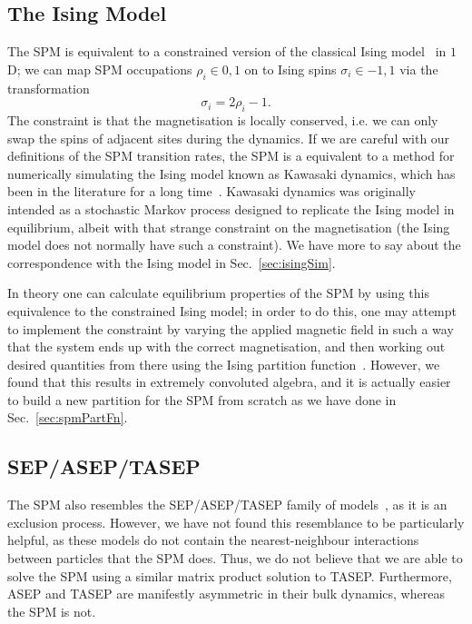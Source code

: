 \subsection{The Ising Model}
The SPM is equivalent to a constrained version of the classical Ising 
model~\cite{lenz1920, Ising1925, strecka2015} in $1$D; we can map SPM
occupations $\rho_i \in {0, 1}$ on to Ising spins $\sigma_i \in {-1, 1}$ via the transformation
\begin{equation}
 \sigma_i = 2 \rho_i - 1 .
\end{equation}
The constraint is that the magnetisation is locally conserved, i.e. we can only swap the spins of adjacent
sites during the dynamics. If we are careful with our definitions of the SPM transition rates,
the SPM is a equivalent to a method for numerically simulating the Ising model known as Kawasaki
dynamics, which has been in the literature for a long time~\cite{kawasaki1966, Garrido1990, grynberg2010}. 
Kawasaki dynamics was originally intended as
a stochastic Markov process designed to replicate the Ising model in equilibrium, albeit with that strange
constraint on the magnetisation (the Ising model does not normally have such a constraint). We have more 
to say about the correspondence with the Ising model in Sec.~\ref{sec:isingSim}.

In theory one can calculate equilibrium properties of the SPM by using this equivalence to the constrained
Ising model; in order to do this, one may attempt to implement the constraint by varying the applied
magnetic field in such a way that the system ends up with the correct magnetisation, and then working
out desired quantities from there using the Ising partition function~\cite{baxter2016}. However, we found that
this results
in extremely convoluted algebra, and it is actually easier to build a new partition for the SPM from 
scratch as we have done in Sec.~\ref{sec:spmPartFn}.
\subsection{SEP/ASEP/TASEP} \label{sec:asep}
The SPM also resembles the SEP/ASEP/TASEP family of models~\cite{liggett1985, golinelli2006, blythe2007,
Crampe2014}, 
as it is an
exclusion process. However, we 
have not found this resemblance to be particularly helpful, as these models do not contain the
nearest-neighbour interactions between particles that the SPM does. Thus, we do not believe that we are
able to solve the SPM using a similar matrix product solution to TASEP. Furthermore, ASEP and TASEP
are manifestly asymmetric in their bulk dynamics, whereas the SPM is not.

